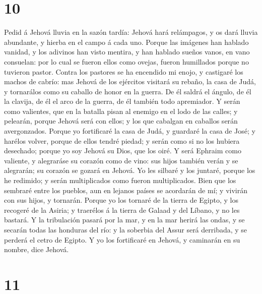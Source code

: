 \hypertarget{section-9}{%
\section{10}\label{section-9}}

 Pedid á Jehová lluvia en la sazón tardía: Jehová hará
relámpagos, y os dará lluvia abundante, y hierba en el campo á cada uno.
 Porque las imágenes han hablado vanidad, y los adivinos
han visto mentira, y han hablado sueños vanos, en vano consuelan: por lo
cual se fueron ellos como ovejas, fueron humillados porque no tuvieron
pastor.  Contra los pastores se ha encendido mi enojo, y
castigaré los machos de cabrío: mas Jehová de los ejércitos visitará su
rebaño, la casa de Judá, y tornarálos como su caballo de honor en la
guerra.  De él saldrá el ángulo, de él la clavija, de él
el arco de la guerra, de él también todo apremiador.  Y
serán como valientes, que en la batalla pisan al enemigo en el lodo de
las calles; y pelearán, porque Jehová será con ellos; y los que cabalgan
en caballos serán avergonzados.  Porque yo fortificaré la
casa de Judá, y guardaré la casa de José; y harélos volver, porque de
ellos tendré piedad; y serán como si no los hubiera desechado; porque yo
soy Jehová su Dios, que los oiré.  Y será Ephraim como
valiente, y alegraráse su corazón como de vino: sus hijos también verán
y se alegrarán; su corazón se gozará en Jehová.  Yo les
silbaré y los juntaré, porque los he redimido; y serán multiplicados
como fueron multiplicados.  Bien que los sembraré entre
los pueblos, aun en lejanos países se acordarán de mí; y vivirán con sus
hijos, y tornarán.  Porque yo los tornaré de la tierra de
Egipto, y los recogeré de la Asiria; y traerélos á la tierra de Galaad y
del Líbano, y no les bastará.  Y la tribulación pasará
por la mar, y en la mar herirá las ondas, y se secarán todas las
honduras del río: y la soberbia del Assur será derribada, y se perderá
el cetro de Egipto.  Y yo los fortificaré en Jehová, y
caminarán en su nombre, dice Jehová.

\hypertarget{section-10}{%
\section{11}\label{section-10}}

